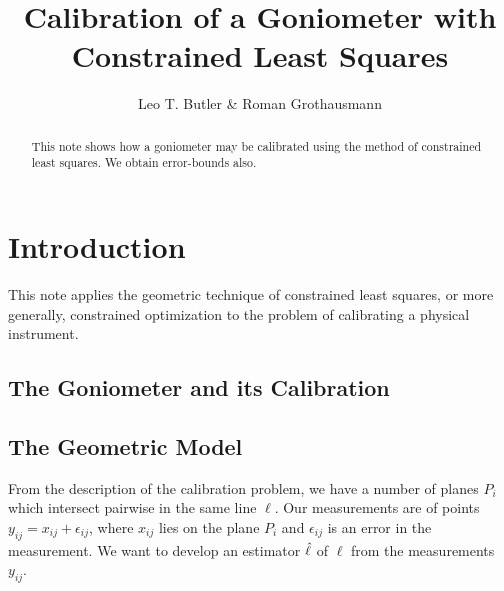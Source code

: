 \documentclass[a4paper,reqno]{amsart}
\title[Goniometer]{Calibration of a Goniometer with Constrained Least
  Squares}
\author{Leo T. Butler \& Roman Grothausmann}
\begin{document}
\begin{abstract}
  This note shows how a goniometer may be calibrated using the method
  of constrained least squares. We obtain error-bounds also.
\end{abstract}
\maketitle

\section{Introduction}
\label{sec:intro}

This note applies the geometric technique of constrained least
squares, or more generally, constrained optimization to the problem of
calibrating a physical instrument.

\subsection{The Goniometer and its Calibration}
\label{sec:goniometer-intro}

\subsection{The Geometric Model}
\label{sec:geometric-model}

From the description of the calibration problem, we have a number of
planes $P_i$ which intersect pairwise in the same line $\ell$. Our
measurements are of points $y_{ij}=x_{ij}+\epsilon_{ij}$, where
$x_{ij}$ lies on the plane $P_i$ and $\epsilon_{ij}$ is an error in
the measurement. We want to develop an estimator $\hat{\ell}$ of
$\ell$ from the measurements $y_{ij}$.
\end{document}
